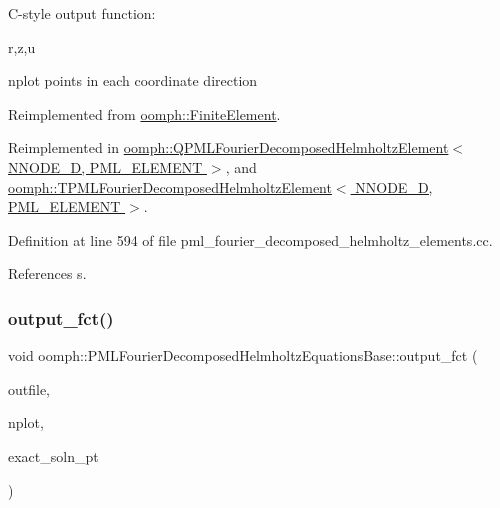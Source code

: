 C-\/style output function\+:

r,z,u

nplot points in each coordinate direction 

Reimplemented from \hyperlink{classoomph_1_1FiniteElement_adfaee690bb0608f03320eeb9d110d48c}{oomph\+::\+Finite\+Element}.



Reimplemented in \hyperlink{classoomph_1_1QPMLFourierDecomposedHelmholtzElement_ad0cc7d26df69a746a4b667ee447d4a7a}{oomph\+::\+Q\+P\+M\+L\+Fourier\+Decomposed\+Helmholtz\+Element$<$ N\+N\+O\+D\+E\+\_\+D, P\+M\+L\+\_\+\+E\+L\+E\+M\+E\+N\+T $>$}, and \hyperlink{classoomph_1_1TPMLFourierDecomposedHelmholtzElement_aec6440de61dd7cd76b77ddd7732744d4}{oomph\+::\+T\+P\+M\+L\+Fourier\+Decomposed\+Helmholtz\+Element$<$ N\+N\+O\+D\+E\+\_\+D, P\+M\+L\+\_\+\+E\+L\+E\+M\+E\+N\+T $>$}.



Definition at line 594 of file pml\+\_\+fourier\+\_\+decomposed\+\_\+helmholtz\+\_\+elements.\+cc.



References s.

\mbox{\label{classoomph_1_1PMLFourierDecomposedHelmholtzEquationsBase_af04cd5b7a06c1f6eb28c013d2f250677}} 
\subsubsection{\texorpdfstring{output\+\_\+fct()}{output\_fct()}\hspace{0.1cm}{\footnotesize\ttfamily [1/2]}}
{\footnotesize\ttfamily void oomph\+::\+P\+M\+L\+Fourier\+Decomposed\+Helmholtz\+Equations\+Base\+::output\+\_\+fct (\begin{DoxyParamCaption}\item[{std\+::ostream \&}]{outfile,  }\item[{const unsigned \&}]{nplot,  }\item[{\hyperlink{classoomph_1_1FiniteElement_a690fd33af26cc3e84f39bba6d5a85202}{Finite\+Element\+::\+Steady\+Exact\+Solution\+Fct\+Pt}}]{exact\+\_\+soln\+\_\+pt }\end{DoxyParamCaption})\hspace{0.3cm}{\ttfamily [virtual]}}

